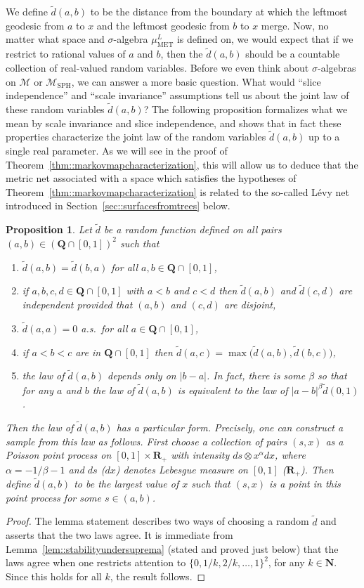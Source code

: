 \documentclass[JEP,XML,SOM,Unicode]{cedram}
\let\mathcal\mathscr
\theoremstyle{plain}
\numberwithin{theorem}{section}
\newtheorem{proposition}[theorem]{Proposition}
\theoremstyle{definition}
\newcommand\gmsspace{{\mathcal M}_{\mathrm{SPH}}}
\newcommand\mmspace{{\mathcal M}}
\newcommand{\R}{\mathbf{R}}
\newcommand{\N}{\mathbf{N}}
\newcommand{\Q}{{\mathbf Q}}
\newcommand{\muml}{\mu_{\mathrm{MET}}^L}
\let\wt\widetilde
\begin{document}
We define $\wt{d}(a,b)$ to be the distance from the boundary at which the leftmost geodesic from $a$ to $x$ and the leftmost geodesic from $b$ to $x$ merge. Now, no matter what space and $\sigma$-algebra $\muml$ is defined on, we would expect that if we restrict to rational values of $a$ and $b$, then the $\wt{d}(a,b)$ should be a countable collection of real-valued random variables. Before we even think about $\sigma$-algebras on $\mmspace$ or $\gmsspace$, we can answer a more basic question. What would ``slice independence'' and ``scale invariance'' assumptions tell us about the joint law of these random variables $\wt{d}(a,b)$? The following proposition formalizes what we mean by scale invariance and slice independence, and shows that in fact these properties characterize the joint law of the random variables $\wt{d}(a,b)$ up to a single real parameter. As we will see in the proof of Theorem~\ref{thm::markovmapcharacterization}, this will allow us to deduce that the metric net associated with a space which satisfies the hypotheses of Theorem~\ref{thm::markovmapcharacterization} is related to the so-called Lévy net introduced in Section~\ref{sec::surfacesfromtrees} below.

\begin{proposition}
\label{prop::poissonslicestructure}
Let $\wt{d}$ be a random function defined on all pairs \hbox{$(a,b)\!\in\!(\Q \cap [0,1])^2$} such that
\begin{enumerate}
\item $\wt{d}(a,b) = \wt{d}(b,a)$ for all $a,b \in \Q \cap [0,1]$,
\item if $a,b,c,d \in \Q \cap [0,1]$ with $a<b$ and $c<d$ then $\wt{d}(a,b)$ and $\wt{d}(c,d)$ are independent provided that $(a,b)$ and $(c,d)$ are disjoint,
\item $\wt{d}(a,a) = 0$ a.s.\ for all $a \in \Q \cap [0,1]$,
\item if $a<b<c$ are in $\Q \cap [0,1]$ then $\wt{d}(a,c) = \max\bigl( \wt{d}(a,b), \wt{d}(b,c) \bigr)$,
\item the law of $\wt{d}(a,b)$ depends only on $|b-a|$. In fact, there is some $\beta$ so that for any $a$ and $b$ the law of $\wt{d}(a,b)$ is equivalent to the law of $|a-b|^{\beta} \wt{d}(0,1)$.
\end{enumerate}
Then the law of $\wt{d}(a,b)$ has a particular form. Precisely, one can construct a sample from this law as follows. First choose a collection of pairs $(s,x)$ as a Poisson point process on $[0,1] \times \R_+$ with intensity $ds \otimes x^{\alpha}dx$, where $\alpha = -1/\beta - 1$ and $ds$ (\resp $dx$) denotes Lebesgue measure on $[0,1]$ (\resp $\R_+$). Then define $\wt{d}(a,b)$ to be the largest value of $x$ such that $(s,x)$ is a point in this point process for some $s \in (a,b)$.
\end{proposition}
\begin{proof}
The lemma statement describes two ways of choosing a random $\wt{d}$ and asserts that the two laws agree. It is immediate from Lemma~\ref{lem::stabilityundersuprema} (stated and proved just below) that the laws agree when one restricts attention to $\{0,1/k,2/k,\ldots, 1\}^2$, for any $k \in \N$. Since this holds for all $k$, the result follows.
\end{proof}
\end{document}
